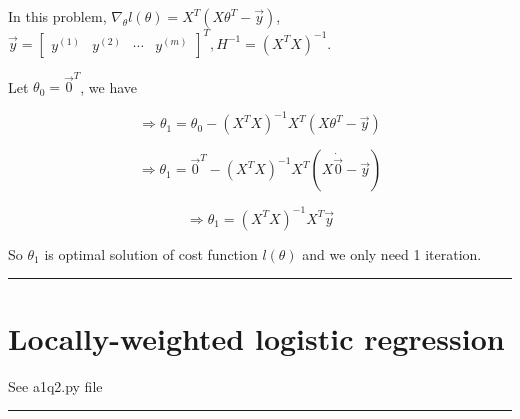 \documentclass[a4paper,14pt]{article}
\begin{document}
\begin{enumerate}[label=(\alph*)]
    In this problem, $\nabla_{\theta}l(\theta) = X^{T}(X\theta^{T}-\vec{y})$, $\vec{y} = \begin{bmatrix}
        y^{(1)} & y^{(2)} & \cdots & y^{(m)}
    \end{bmatrix}^{T}, H^{-1} = (X^{T}X)^{-1}$.
    
    Let $\theta_{0} = \vec{0}^{T}$, we have
    
    \begin{equation}
        \Rightarrow \theta_{1} = \theta_{0} - (X^{T}X)^{-1}X^{T}(X\theta^{T}-\vec{y})
    \end{equation}
    
    \begin{equation}
        \Rightarrow \theta_{1} = \vec{0}^T - (X^{T}X)^{-1}X^{T}(X\dot \vec{0}-\vec{y})
    \end{equation}
    
    \begin{equation}
        \Rightarrow \theta_{1} = (X^{T}X)^{-1}X^{T}\vec{y}
    \end{equation}
    
    So $\theta_{1}$ is optimal solution of cost function $l(\theta)$ and we only need 1 iteration.
\end{enumerate}


\noindent\rule{\textwidth}{0.5pt}
\section{Locally-weighted logistic regression}
See a1q2.py file

\noindent\rule{\textwidth}{0.5pt}
\end{document}
